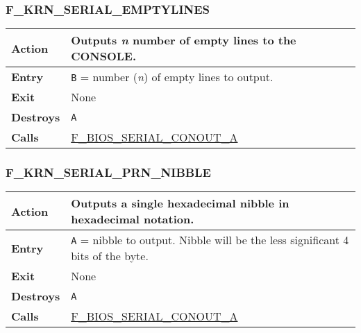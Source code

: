 \documentclass[a4paper,11pt]{article}
\begin{document}
        \subsubsection{F\_KRN\_SERIAL\_EMPTYLINES}
        \label{func:fkrnserialemptylines}
        \begin{tabular}{l p{9cm}}
            \hline\textbf{Action}
            & Outputs \textit{n} number of empty lines to the \textbf{CONSOLE}.\\
            \hline\textbf{Entry} & \texttt{B} = number (\textit{n}) of empty
            lines to output. \\
            \hline\textbf{Exit} & None \\
            \hline\textbf{Destroys} & \texttt{A} \\
            \hline\textbf{Calls}
            & \hyperref[func:fbiosserialconouta]{F\_BIOS\_SERIAL\_CONOUT\_A}\\
            \hline
        \end{tabular}

        \subsubsection{F\_KRN\_SERIAL\_PRN\_NIBBLE}
        \label{func:fkrnserialprnnibble}
        \begin{tabular}{l p{9cm}}
            \hline\textbf{Action}
            & Outputs a single hexadecimal nibble in hexadecimal notation.\\
            \hline\textbf{Entry}
            & \texttt{A} = nibble to output. Nibble will be the less significant 
            4 bits of the byte.\\
            \hline\textbf{Exit} & None \\
            \hline\textbf{Destroys} & \texttt{A} \\
            \hline\textbf{Calls}
            & \hyperref[func:fbiosserialconouta]{F\_BIOS\_SERIAL\_CONOUT\_A}\\
            \hline
        \end{tabular}

\end{document}
